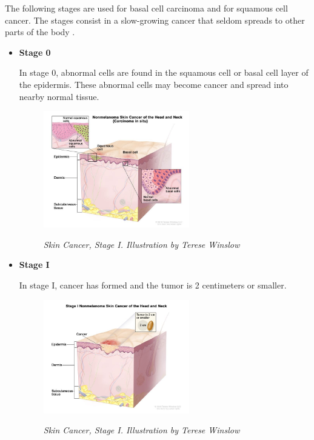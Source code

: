 The following stages are used for basal cell carcinoma and for squamous cell
cancer. The stages consist in a slow-growing cancer that seldom spreads to
other parts of the body \cite{CancerInstitute}. \\

\begin{itemize}

  \item \textbf{Stage 0}

    In stage 0, abnormal cells are found in the squamous cell or basal cell
    layer of the epidermis. These abnormal cells may become cancer and spread
    into nearby normal tissue.

    \begin{figure}[H] \centering
      \includegraphics[width=0.6\textwidth]{imatges/problem_domain/phase0-skin-cancer.jpg}
      \caption[Skin Cancer, Stage I]{\textit{Skin Cancer, Stage I. Illustration by Terese Winslow}}
    {\label{fig:stage0-skin-canceer}} \end{figure}

    \newpage


  \item \textbf{Stage I}

    In stage I, cancer has formed and the tumor is 2 centimeters or smaller.

    \begin{figure}[H] \centering
      \includegraphics[width=0.6\textwidth]{imatges/problem_domain/stage1-skin-cancer.jpg}
      \caption[Skin Cancer, Stage I]{\textit{Skin Cancer, Stage I.
      Illustration by Terese Winslow}} {\label{fig:stage1-skin-canceer}}
    \end{figure}



\end{itemize}
